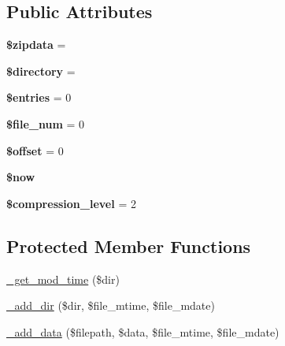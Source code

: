 \subsection*{Public Attributes}
\begin{DoxyCompactItemize}
\item 
\mbox{\label{class_c_i___zip_a508ded64faec4c5e56ed8db0c691a730}} 
{\bfseries \$zipdata} = \textquotesingle{}\textquotesingle{}
\item 
\mbox{\label{class_c_i___zip_a3ec44f1a5f515c7413d22e99cf961d7c}} 
{\bfseries \$directory} = \textquotesingle{}\textquotesingle{}
\item 
\mbox{\label{class_c_i___zip_aa7abb0e2feb9d9e5dcdabf425355084a}} 
{\bfseries \$entries} = 0
\item 
\mbox{\label{class_c_i___zip_a1af446618a6e011e05db9724bde556c4}} 
{\bfseries \$file\+\_\+num} = 0
\item 
\mbox{\label{class_c_i___zip_a9350a073674ee320f36612fcabd39259}} 
{\bfseries \$offset} = 0
\item 
\mbox{\label{class_c_i___zip_a72e3970472e6385383f8ae04b01d9082}} 
{\bfseries \$now}
\item 
\mbox{\label{class_c_i___zip_aa7f2b6156f0208a7a8d8039c2591eab5}} 
{\bfseries \$compression\+\_\+level} = 2
\end{DoxyCompactItemize}
\subsection*{Protected Member Functions}
\begin{DoxyCompactItemize}
\item 
\mbox{\hyperlink{class_c_i___zip_a73862e9ae153a3035ba5a695311db810}{\+\_\+get\+\_\+mod\+\_\+time}} (\$dir)
\item 
\mbox{\hyperlink{class_c_i___zip_abcf3b2939062f3519a88df10bb4e7aee}{\+\_\+add\+\_\+dir}} (\$dir, \$file\+\_\+mtime, \$file\+\_\+mdate)
\item 
\mbox{\hyperlink{class_c_i___zip_a5f9aee83829fa88a567a475ad5d8039f}{\+\_\+add\+\_\+data}} (\$filepath, \$data, \$file\+\_\+mtime, \$file\+\_\+mdate)
\end{DoxyCompactItemize}
